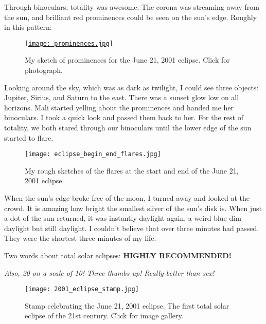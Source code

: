 Through binoculars, totality was awesome. The corona was streaming away
from the sun, and brilliant red prominences could be seen on the sun's
edge. Roughly in this pattern:

\begin{SCfigure}[1][!h]
\centering
\href{https://conceptcontrol.smugmug.com/Trips/Overseas/Zambia-Eclipse-Trip-1/i-WGmRwTJ/A}{\texttt{[image: prominences.jpg]}}
\caption{My sketch of prominences for the June 21, 2001 eclipse. Click for photograph.}
\label{fig:8074X2}
\end{SCfigure}

Looking around the sky, which was as dark as twilight, I could see three
objects: Jupiter, Sirius, and Saturn to the east. There was a sunset
glow low on all horizons. Mali started yelling about the prominences and handed
me her binoculars. I took a quick look and passed them back to her. For
the rest of totality, we both stared through our binoculars until the
lower edge of the sun started to flare.


\begin{SCfigure}
\centering
\texttt{[image: eclipse\_begin\_end\_flares.jpg]}
\caption{My rough sketches of the flares at the start and end of the June 21, 2001 eclipse.}
\label{fig:8074X4}
\end{SCfigure}

When the sun's edge broke free of the moon, I turned away and looked at
the crowd. It is amazing how bright the
smallest sliver of the sun's disk is. When just a dot of the sun
returned, it was instantly daylight again, a weird blue dim daylight but
still daylight. I couldn't believe that over three minutes had passed.
They were the shortest three minutes of my life.

Two words about total solar eclipses: \textbf{HIGHLY RECOMMENDED!}

\emph{Also, 20 on a scale of 10! Three thumbs up! Really better than sex!}

\begin{SCfigure}[1][!h]
\centering
\texttt{[image: 2001\_eclipse\_stamp.jpg]}
\caption{Stamp celebrating the June 21, 2001 eclipse. The first total
solar eclipse of the 21st century. Click for image gallery.}
\label{fig:8074X5}
\end{SCfigure}

%
